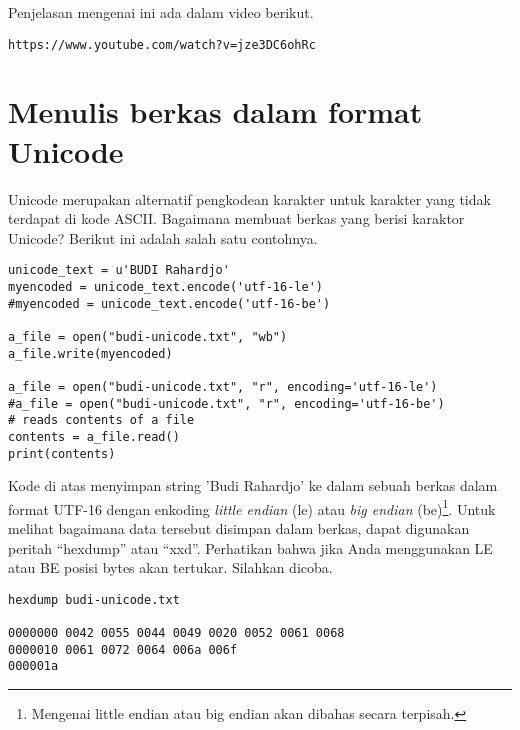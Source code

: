 Penjelasan mengenai ini ada dalam video berikut.
\begin{verbatim}
https://www.youtube.com/watch?v=jze3DC6ohRc
\end{verbatim}


\section{Menulis berkas dalam format Unicode}
Unicode merupakan alternatif pengkodean karakter untuk karakter yang tidak
terdapat di kode ASCII. Bagaimana membuat berkas yang berisi karaktor Unicode?
Berikut ini adalah salah satu contohnya.

\begin{verbatim}
unicode_text = u'BUDI Rahardjo'
myencoded = unicode_text.encode('utf-16-le')
#myencoded = unicode_text.encode('utf-16-be')
   
a_file = open("budi-unicode.txt", "wb")
a_file.write(myencoded)

a_file = open("budi-unicode.txt", "r", encoding='utf-16-le')
#a_file = open("budi-unicode.txt", "r", encoding='utf-16-be')
# reads contents of a file
contents = a_file.read()
print(contents)   
\end{verbatim}   

Kode di atas menyimpan string 'Budi Rahardjo' ke dalam sebuah berkas dalam
format UTF-16 dengan enkoding {\em little endian} (le) atau {\em big endian}
(be)\footnote{Mengenai little endian atau big endian akan dibahas secara terpisah.}.
Untuk melihat bagaimana data tersebut disimpan dalam berkas,
dapat digunakan peritah ``hexdump'' atau ``xxd''.
Perhatikan bahwa jika Anda menggunakan LE atau BE posisi bytes akan tertukar.
Silahkan dicoba.

\begin{verbatim}
hexdump budi-unicode.txt

0000000 0042 0055 0044 0049 0020 0052 0061 0068
0000010 0061 0072 0064 006a 006f               
000001a
\end{verbatim}